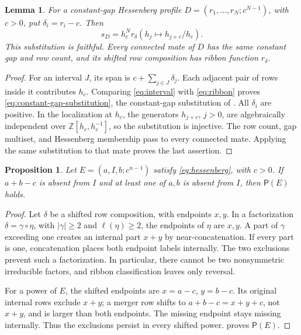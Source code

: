 \documentclass[11pt,a4paper]{amsart}
\numberwithin{equation}{section}
\theoremstyle{plain}
\newtheorem{proposition}[theorem]{Proposition}
\newtheorem{lemma}[theorem]{Lemma}
\theoremstyle{definition}
\begin{document}
\begin{lemma}\label{lem:constant-gap-substitution}
For a constant-gap Hessenberg profile \(D=(r_1,\ldots,r_N;c^{N-1})\), with \(c>0\), put \(\delta_i=r_i-c\).  Then
\begin{equation}\label{eq:constant-gap-substitution}
 s_D=h_c^N r_\delta(h_j\mapsto h_{j+c}/h_c).
\end{equation}
This substitution is faithful.  Every connected mate of \(D\) has the same constant gap and row count, and its shifted row composition has ribbon function \(r_\delta\).
\end{lemma}
\begin{proof}
For an interval \(J\), its span is \(c+\sum_{j\in J}\delta_j\).  Each adjacent pair of rows inside it contributes \(h_c\).  Comparing \eqref{eq:interval} with \eqref{eq:ribbon} proves \eqref{eq:constant-gap-substitution}, the constant-gap substitution of \cite{Shields2026Inflation}.  All \(\delta_i\) are positive.  In the localization at \(h_c\), the generators \(h_{j+c}\), \(j>0\), are algebraically independent over \(\mathbb Z[h_c,h_c^{-1}]\), so the substitution is injective.  The row count, gap multiset, and Hessenberg membership pass to every connected mate.  Applying the same substitution to that mate proves the last assertion.
\end{proof}

\begin{proposition}\label{prop:constant-gap-recognition}
Let \(E=(a,I,b;c^{n-1})\) satisfy \eqref{eq:hessenberg}, with \(c>0\).  If \(a+b-c\) is absent from \(I\) and at least one of \(a,b\) is absent from \(I\), then \(\mathsf P(E)\) holds.
\end{proposition}
\begin{proof}
Let \(\delta\) be a shifted row composition, with endpoints \(x,y\).  In a factorization \(\delta=\gamma\circ\eta\), with \(|\gamma|\ge2\) and \(\ell(\eta)\ge2\), the endpoints of \(\eta\) are \(x,y\).  A part of \(\gamma\) exceeding one creates an internal part \(x+y\) by near-concatenation.  If every part is one, concatenation places both endpoint labels internally.  The two exclusions prevent such a factorization.  In particular, there cannot be two nonsymmetric irreducible factors, and ribbon classification leaves only reversal.

For a power of \(E\), the shifted endpoints are \(x=a-c\), \(y=b-c\).  Its original internal rows exclude \(x+y\); a merger row shifts to \(a+b-c=x+y+c\), not \(x+y\), and is larger than both endpoints.  The missing endpoint stays missing internally.  Thus the exclusions persist in every shifted power.   proves \(\mathsf P(E)\).
\end{proof}
\end{document}
